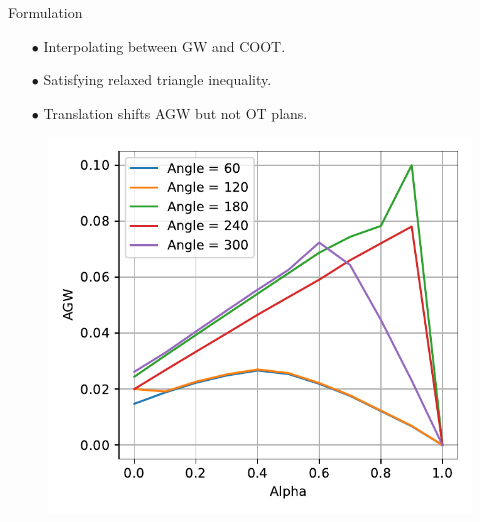 \documentclass{beamer}
\begin{document}
\begin{frame}{Formulation}
\begin{minipage}[t]{0.55\linewidth}
  \begin{itemize}
    \item[$\bullet$] Interpolating between GW and COOT.
    \item[$\bullet$] Satisfying relaxed triangle inequality.
    \item[$\bullet$] Translation shifts AGW but not OT plans.
  \end{itemize}
  \end{minipage}%
  \hfill%
  \hspace{-6cm}
  \begin{minipage}[t]{0.5\linewidth}
    \vspace{-0.2cm}
  \begin{figure}
    \centering
    \includegraphics[width=1.05\linewidth, keepaspectratio=true]{OT_new/agw_alpha.pdf}
  \end{figure}
  \end{minipage}

\end{frame}
\end{document}
